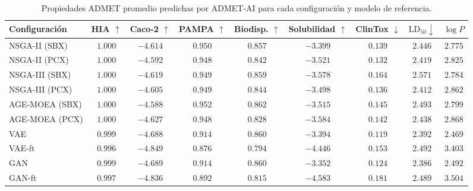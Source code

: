 \begin{table}[htbp]
\centering
\caption{Propiedades ADMET promedio predichas por ADMET-AI para cada configuración y modelo de referencia.}
\label{tab:admet_resumen}
\begin{tabular}{lcccccccc}
\toprule
Configuración & HIA $\uparrow$ & Caco-2 $\uparrow$ & PAMPA $\uparrow$ & Biodisp. $\uparrow$ & Solubilidad $\uparrow$ & ClinTox $\downarrow$ & $\text{LD}_{50} \downarrow$ & $\log P$ \\
\midrule
NSGA-II (SBX) & $1.000$ & $-4.614$ & $0.950$ & $0.857$ & $-3.399$ & $0.139$ & $2.446$ & $2.775$ \\
NSGA-II (PCX) & $1.000$ & $-4.592$ & $0.948$ & $0.842$ & $-3.521$ & $0.132$ & $2.419$ & $2.825$ \\
NSGA-III (SBX) & $1.000$ & $-4.619$ & $0.949$ & $0.859$ & $-3.578$ & $0.164$ & $2.571$ & $2.784$ \\
NSGA-III (PCX) & $1.000$ & $-4.605$ & $0.949$ & $0.844$ & $-3.498$ & $0.136$ & $2.412$ & $2.862$ \\
AGE-MOEA (SBX) & $1.000$ & $-4.588$ & $0.952$ & $0.862$ & $-3.515$ & $0.145$ & $2.493$ & $2.799$ \\
AGE-MOEA (PCX) & $1.000$ & $-4.627$ & $0.948$ & $0.828$ & $-3.584$ & $0.142$ & $2.438$ & $2.868$ \\
\midrule
VAE & $0.999$ & $-4.688$ & $0.914$ & $0.860$ & $-3.394$ & $0.119$ & $2.392$ & $2.469$ \\
VAE-ft & $0.996$ & $-4.849$ & $0.876$ & $0.794$ & $-4.446$ & $0.153$ & $2.492$ & $3.403$ \\
GAN & $0.999$ & $-4.689$ & $0.914$ & $0.860$ & $-3.352$ & $0.124$ & $2.386$ & $2.492$ \\
GAN-ft & $0.997$ & $-4.836$ & $0.892$ & $0.815$ & $-4.583$ & $0.181$ & $2.489$ & $3.504$ \\
\bottomrule
\end{tabular}
\end{table}

